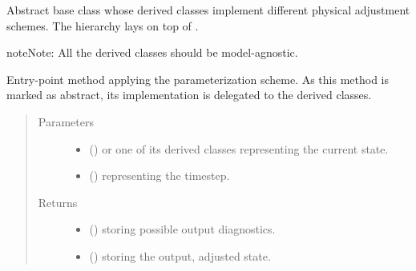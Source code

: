 \documentclass[letterpaper,10pt,english]{sphinxmanual}
\begin{document}
\begin{fulllineitems}
\label{\detokenize{api:tasmania.parameterizations.adjustments.Adjustment}}
Abstract base class whose derived classes implement different physical adjustment schemes.
The hierarchy lays on top of .

\begin{sphinxadmonition}{note}{Note:}
All the derived classes should be model-agnostic.
\end{sphinxadmonition}

\begin{fulllineitems}
\label{\detokenize{api:tasmania.parameterizations.adjustments.Adjustment.__call__}}
Entry-point method applying the parameterization scheme.
As this method is marked as abstract, its implementation is delegated to the derived classes.
\begin{quote}\begin{description}
\item[{Parameters}] \leavevmode\begin{itemize}
\item {} 
 () \textendash{} {\hyperref[\detokenize{api:tasmania.storages.grid_data.GridData}]{}} or one of its derived classes representing the current state.

\item {} 
 () \textendash{}  representing the timestep.

\end{itemize}

\item[{Returns}] \leavevmode
\begin{itemize}
\item {} 
 () \textendash{} {\hyperref[\detokenize{api:tasmania.storages.grid_data.GridData}]{}} storing possible output diagnostics.

\item {} 
 () \textendash{} {\hyperref[\detokenize{api:tasmania.storages.grid_data.GridData}]{}} storing the output, adjusted state.


\end{itemize}
\end{description}
\end{quote}
\end{fulllineitems}
\end{fulllineitems}
\end{document}
